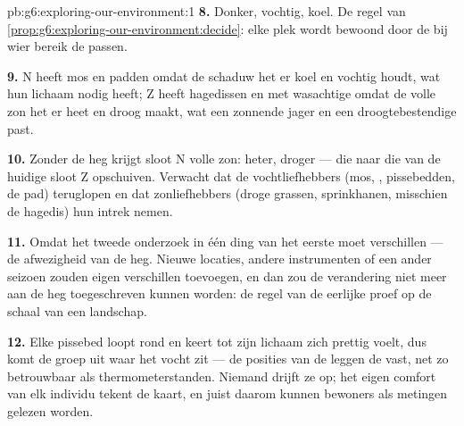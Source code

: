 \begin{solution}{pb:g6:exploring-our-environment:1}
\textbf{8.} Donker, vochtig, koel. De regel van
\cref{prop:g6:exploring-our-environment:decide}: elke plek wordt bewoond
door de  bij wier bereik de  passen.

\textbf{9.} N heeft mos en padden omdat de schaduw het er koel en
vochtig houdt, wat hun lichaam nodig heeft; Z heeft hagedissen en
 met wasachtige  omdat de volle zon het er heet en droog
maakt, wat een zonnende jager en een droogtebestendige  past.

\textbf{10.} Zonder de heg krijgt sloot N volle zon: heter, droger ---
 die naar die van de huidige sloot Z opschuiven. Verwacht
dat de vochtliefhebbers (mos, , pissebedden, de pad) teruglopen en
dat zonliefhebbers (droge grassen, sprinkhanen, misschien de hagedis)
hun intrek nemen.

\textbf{11.} Omdat het tweede onderzoek in één ding van het eerste moet
verschillen --- de afwezigheid van de heg. Nieuwe locaties, andere
instrumenten of een ander seizoen zouden eigen verschillen toevoegen, en
dan zou de verandering niet meer aan de heg toegeschreven kunnen worden:
de regel van de eerlijke proef op de schaal van een landschap.

\textbf{12.} Elke pissebed loopt rond en keert tot zijn lichaam zich
prettig voelt, dus komt de groep uit waar het vocht zit --- de posities
van de  leggen de  vast, net zo betrouwbaar als
thermometerstanden. Niemand drijft ze op; het eigen comfort van elk
individu tekent de kaart, en juist daarom kunnen bewoners als metingen
gelezen worden.
\end{solution}
